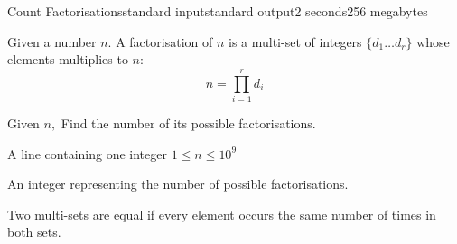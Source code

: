 \begin{problem}{Count Factorisations}{standard input}{standard output}{2 seconds}{256 megabytes}

Given a number $n.$ A factorisation of $n$ is a multi-set of integers $\{ d_1 \dots  d_r \}$ whose elements multiplies to $n:$
$$
n=\prod_{i=1}^r d_i
$$

Given $n,$ Find the number of its possible factorisations.

\InputFile
A line containing one integer $1 \le n \le 10^9$

\OutputFile
An integer representing the number of possible factorisations.

\Examples

\begin{example}
%
%
\end{example}

\Note
Two multi-sets are equal if every element occurs the same number of times in both sets.

\end{problem}

